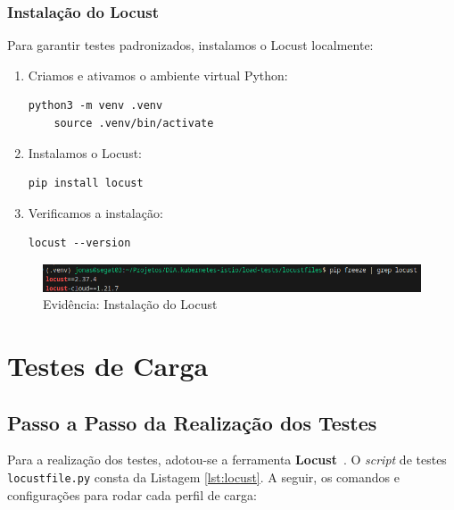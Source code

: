 \documentclass[12pt,a4paper]{report}
\begin{document}
\subsection{Instalação do Locust}
Para garantir testes padronizados, instalamos o Locust localmente:
\begin{enumerate}
  \item Criamos e ativamos o ambiente virtual Python:
    \begin{lstlisting}[style=shell]
    python3 -m venv .venv
    source .venv/bin/activate
    \end{lstlisting}
  \item Instalamos o Locust:
    \begin{lstlisting}[style=shell]
    pip install locust
    \end{lstlisting}
  \item Verificamos a instalação:
    \begin{lstlisting}[style=shell]
    locust --version
    \end{lstlisting}
\end{enumerate}

\begin{figure}[h]
    \centering
    \includegraphics[width=1\linewidth]{figures/evidence-locust.png}
    \caption{Evidência: Instalação do Locust}
    \label{fig:locust}
\end{figure}

\chapter{Testes de Carga}

\section{Passo a Passo da Realização dos Testes}
Para a realização dos testes, adotou-se a ferramenta \textbf{Locust}~\cite{locust2025, locust_github}.
O \textit{script} de testes \texttt{locustfile.py} consta da Listagem \ref{lst:locust}.
A seguir, os comandos e configurações para rodar cada perfil de carga:
\end{document}
